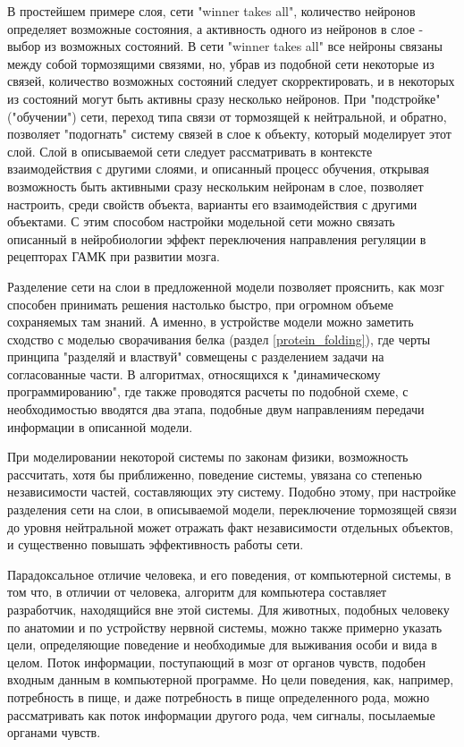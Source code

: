 В простейшем примере слоя, сети "winner takes all", количество нейронов определяет возможные состояния, а активность одного из нейронов в слое - выбор из возможных состояний. В сети "winner takes all" все нейроны связаны между собой тормозящими связями, но, убрав из подобной сети некоторые из связей, количество возможных состояний следует скорректировать, и в некоторых из состояний могут быть активны сразу несколько нейронов. При "подстройке" ("обучении") сети, переход типа связи от тормозящей к нейтральной, и обратно, позволяет "подогнать" систему связей в слое к объекту, который моделирует этот слой. Слой в описываемой сети следует рассматривать в контексте взаимодействия с другими слоями, и описанный процесс обучения, открывая возможность быть активными сразу нескольким нейронам в слое, позволяет настроить, среди свойств объекта, варианты его взаимодействия с другими объектами. С этим способом настройки модельной сети можно связать описанный в нейробиологии эффект переключения направления регуляции в рецепторах ГАМК при развитии мозга.

Разделение сети на слои в предложенной модели позволяет прояснить, как мозг способен принимать решения настолько быстро, при огромном объеме сохраняемых там знаний. А именно, в устройстве модели можно заметить сходство с моделью сворачивания белка (раздел \ref{protein_folding}), где черты принципа "разделяй и властвуй" совмещены с разделением задачи на согласованные части. В алгоритмах, относящихся к "динамическому программированию", где также проводятся расчеты по подобной схеме, с необходимостью вводятся два этапа, подобные двум направлениям передачи информации в описанной модели.

При моделировании некоторой системы по законам физики, возможность рассчитать, хотя бы приближенно, поведение системы, увязана со степенью независимости частей, составляющих эту систему. Подобно этому, при настройке разделения сети на слои, в описываемой модели, переключение тормозящей связи до уровня нейтральной может отражать факт независимости отдельных объектов, и существенно повышать эффективность работы сети.  

Парадоксальное отличие человека, и его поведения, от компьютерной системы, в том что, в отличии от человека, алгоритм для компьютера составляет разработчик, находящийся вне этой системы. Для животных, подобных человеку по анатомии и по устройству нервной системы, можно также примерно указать цели, определяющие поведение и необходимые для выживания особи и вида в целом. Поток информации, поступающий в мозг от органов чувств, подобен входным данным в компьютерной программе. Но цели поведения, как, например, потребность в пище, и даже потребность в пище определенного рода, можно рассматривать как поток информации другого рода, чем сигналы, посылаемые органами чувств.


